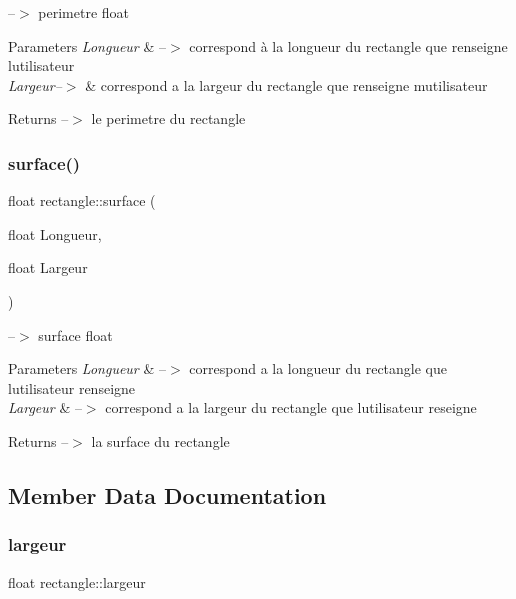 --$>$ perimetre  float 
\begin{DoxyParams}{Parameters}
{\em Longueur} & --$>$ correspond à la longueur du rectangle que renseigne l\textquotesingle{}utilisateur \\
\hline
{\em Largeur--$>$} & correspond a la largeur du rectangle que renseigne m\textquotesingle{}utilisateur \\
\hline
\end{DoxyParams}
\begin{DoxyReturn}{Returns}
--$>$ le perimetre du rectangle 
\end{DoxyReturn}
\mbox{\label{classrectangle_a6625a89c81749e339538ca4c0ea0ed0c}} 
\subsubsection{\texorpdfstring{surface()}{surface()}}
{\footnotesize\ttfamily float rectangle\+::surface (\begin{DoxyParamCaption}\item[{float}]{Longueur,  }\item[{float}]{Largeur }\end{DoxyParamCaption})}

--$>$ surface  float 
\begin{DoxyParams}{Parameters}
{\em Longueur} & --$>$ correspond a la longueur du rectangle que l\textquotesingle{}utilisateur renseigne \\
\hline
{\em Largeur} & --$>$ correspond a la largeur du rectangle que l\textquotesingle{}utilisateur reseigne \\
\hline
\end{DoxyParams}
\begin{DoxyReturn}{Returns}
--$>$ la surface du rectangle 
\end{DoxyReturn}


\subsection{Member Data Documentation}
\mbox{\label{classrectangle_afcdec92029cdbf85d33d8e11f389b37e}} 
\subsubsection{\texorpdfstring{largeur}{largeur}}
{\footnotesize\ttfamily float rectangle\+::largeur}

